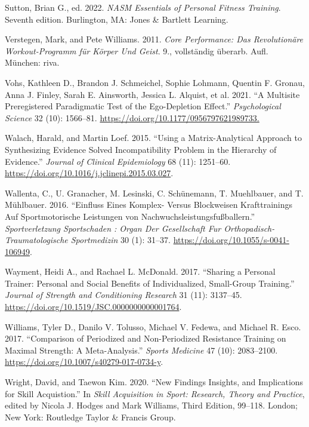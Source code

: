 \documentclass[
  letterpaper,
  DIV=11,
  numbers=noendperiod]{scrreprt}
\newlength{\cslhangindent}
\newenvironment{CSLReferences}[2] %
 {\begin{list}{}{%
  \setlength{\itemindent}{0pt}
  \setlength{\leftmargin}{0pt}
  \setlength{\parsep}{0pt}
  \ifodd #1
   \setlength{\leftmargin}{\cslhangindent}
   \setlength{\itemindent}{-1\cslhangindent}
  \fi
  \setlength{\itemsep}{#2\baselineskip}}}
 {\end{list}}
\begin{document}
\begin{CSLReferences}{1}{0}
Sutton, Brian G., ed. 2022. \emph{{NASM} Essentials of Personal Fitness
Training}. Seventh edition. Burlington, MA: Jones \& Bartlett Learning.

Verstegen, Mark, and Pete Williams. 2011. \emph{Core Performance: {Das}
Revolution{ä}re {Workout-Programm} f{ü}r {K{ö}rper} Und {Geist}}. 9.,
vollst{ä}ndig {ü}berarb. Aufl. M{ü}nchen: riva.

Vohs, Kathleen D., Brandon J. Schmeichel, Sophie Lohmann, Quentin F.
Gronau, Anna J. Finley, Sarah E. Ainsworth, Jessica L. Alquist, et al.
2021. {``A {Multisite Preregistered Paradigmatic Test} of the
{Ego-Depletion Effect}.''} \emph{Psychological Science} 32 (10):
1566--81. \url{https://doi.org/10.1177/0956797621989733.}

Walach, Harald, and Martin Loef. 2015. {``Using a Matrix-Analytical
Approach to Synthesizing Evidence Solved Incompatibility Problem in the
Hierarchy of Evidence.''} \emph{Journal of Clinical Epidemiology} 68
(11): 1251--60. \url{https://doi.org/10.1016/j.jclinepi.2015.03.027}.

Wallenta, C., U. Granacher, M. Lesinski, C. Schünemann, T. Muehlbauer,
and T. Mühlbauer. 2016. {``Einfluss Eines {Komplex-} Versus Blockweisen
{Krafttrainings} Auf Sportmotorische {Leistungen} von
{Nachwuchsleistungsfu{ß}ballern}.''} \emph{Sportverletzung Sportschaden
: Organ Der Gesellschaft Fur Orthopadisch-Traumatologische Sportmedizin}
30 (1): 31--37. \url{https://doi.org/10.1055/s-0041-106949}.

Wayment, Heidi A., and Rachael L. McDonald. 2017. {``Sharing a {Personal
Trainer}: {Personal} and {Social Benefits} of {Individualized},
{Small-Group Training}.''} \emph{Journal of Strength and Conditioning
Research} 31 (11): 3137--45.
\url{https://doi.org/10.1519/JSC.0000000000001764}.

Williams, Tyler D., Danilo V. Tolusso, Michael V. Fedewa, and Michael R.
Esco. 2017. {``Comparison of {Periodized} and {Non-Periodized Resistance
Training} on {Maximal Strength}: {A Meta-Analysis}.''} \emph{Sports
Medicine} 47 (10): 2083--2100.
\url{https://doi.org/10.1007/s40279-017-0734-y}.

Wright, David, and Taewon Kim. 2020. {``New Findings Insights, and
Implications for Skill Acquistion.''} In \emph{Skill Acquisition in
Sport: {Research}, Theory and Practice}, edited by Nicola J. Hodges and
Mark Williams, Third Edition, 99--118. London; New York: Routledge
Taylor \& Francis Group.

\end{CSLReferences}
\end{document}

